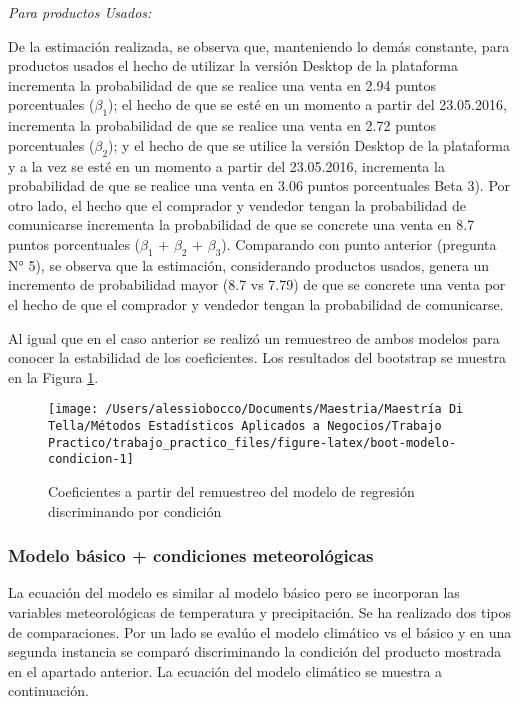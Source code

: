 \documentclass[
  12pt]{article}
\begin{document}
\emph{Para productos Usados:}

De la estimación realizada, se observa que, manteniendo lo demás constante, para productos usados el hecho de utilizar la versión Desktop de la plataforma incrementa la probabilidad de que se realice una venta en 2.94 puntos porcentuales (\(\beta_1\)); el hecho de que se esté en un momento a partir del 23.05.2016, incrementa la probabilidad de que se realice una venta en 2.72 puntos porcentuales (\(\beta_2\)); y el hecho de que se utilice la versión Desktop de la plataforma y a la vez se esté en un momento a partir del 23.05.2016, incrementa la probabilidad de que se realice una venta en 3.06 puntos porcentuales Beta 3).
Por otro lado, el hecho que el comprador y vendedor tengan la probabilidad de comunicarse incrementa la probabilidad de que se concrete una venta en 8.7 puntos porcentuales (\(\beta_1\) + \(\beta_2\) + \(\beta_3\)).
Comparando con punto anterior (pregunta N° 5), se observa que la estimación, considerando productos usados, genera un incremento de probabilidad mayor (8.7 vs 7.79) de que se concrete una venta por el hecho de que el comprador y vendedor tengan la probabilidad de comunicarse.

Al igual que en el caso anterior se realizó un remuestreo de ambos modelos para conocer la estabilidad de los coeficientes. Los resultados del bootstrap se muestra en la Figura \ref{fig:boot-modelo-condicion}.

\begin{figure}

{\centering \texttt{[image: /Users/alessiobocco/Documents/Maestria/Maestría Di Tella/Métodos Estadísticos Aplicados a Negocios/Trabajo Practico/trabajo\_practico\_files/figure-latex/boot-modelo-condicion-1]} 

}

\caption{Coeficientes a partir del remuestreo del modelo de regresión discriminando por condición}\label{fig:boot-modelo-condicion}
\end{figure}

\hypertarget{modelo-buxe1sico-condiciones-meteoroluxf3gicas}{%
\subsubsection{Modelo básico + condiciones meteorológicas}\label{modelo-buxe1sico-condiciones-meteoroluxf3gicas}}

La ecuación del modelo es similar al modelo básico pero se incorporan las variables meteorológicas de temperatura y precipitación. Se ha realizado dos tipos de comparaciones. Por un lado se evalúo el modelo climático vs el básico y en una segunda instancia se comparó discriminando la condición del producto mostrada en el apartado anterior. La ecuación del modelo climático se muestra a continuación.
\end{document}
